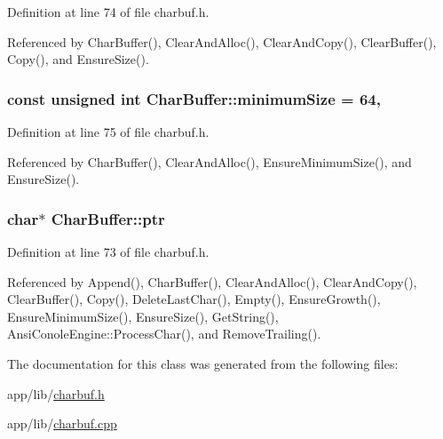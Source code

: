 Definition at line 74 of file charbuf.\+h.



Referenced by Char\+Buffer(), Clear\+And\+Alloc(), Clear\+And\+Copy(), Clear\+Buffer(), Copy(), and Ensure\+Size().

\subsubsection[{\texorpdfstring{minimum\+Size}{minimumSize}}]{\setlength{\rightskip}{0pt plus 5cm}const unsigned int Char\+Buffer\+::minimum\+Size = 64\hspace{0.3cm}{\ttfamily [static]}, {\ttfamily [private]}}\hypertarget{classCharBuffer_a42fcc0397a2d7cb6d412a124de076aff}{}\label{classCharBuffer_a42fcc0397a2d7cb6d412a124de076aff}


Definition at line 75 of file charbuf.\+h.



Referenced by Char\+Buffer(), Clear\+And\+Alloc(), Ensure\+Minimum\+Size(), and Ensure\+Size().

\subsubsection[{\texorpdfstring{ptr}{ptr}}]{\setlength{\rightskip}{0pt plus 5cm}char$\ast$ Char\+Buffer\+::ptr\hspace{0.3cm}{\ttfamily [private]}}\hypertarget{classCharBuffer_a2d313433650506fd6609e6947729dfb0}{}\label{classCharBuffer_a2d313433650506fd6609e6947729dfb0}


Definition at line 73 of file charbuf.\+h.



Referenced by Append(), Char\+Buffer(), Clear\+And\+Alloc(), Clear\+And\+Copy(), Clear\+Buffer(), Copy(), Delete\+Last\+Char(), Empty(), Ensure\+Growth(), Ensure\+Minimum\+Size(), Ensure\+Size(), Get\+String(), Ansi\+Conole\+Engine\+::\+Process\+Char(), and Remove\+Trailing().



The documentation for this class was generated from the following files\+:\begin{DoxyCompactItemize}
\item 
app/lib/\hyperlink{charbuf_8h}{charbuf.\+h}\item 
app/lib/\hyperlink{charbuf_8cpp}{charbuf.\+cpp}\end{DoxyCompactItemize}
